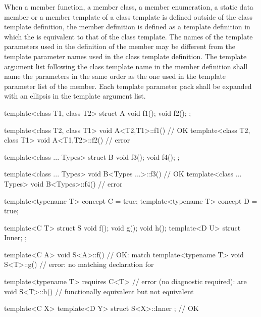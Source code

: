 \pnum
When a member function, a member class, a member enumeration, a static data member or
a member template of a class
template is defined outside of the class template definition,
the member definition is defined as a template definition in which the
 is equivalent to that
of the class template.
The names of the template parameters used in the definition of the member may
be different from the template parameter names used in the class
template definition.
The template argument list following the class template name in the member
definition shall name the parameters in the same order as the one used in
the template parameter list of the member. Each template
parameter pack shall be expanded with an ellipsis in the template
argument list.
\begin{example}
\begin{codeblock}
template<class T1, class T2> struct A {
  void f1();
  void f2();
};

template<class T2, class T1> void A<T2,T1>::f1() { }    // OK
template<class T2, class T1> void A<T1,T2>::f2() { }    // error
\end{codeblock}

\begin{codeblock}
template<class ... Types> struct B {
  void f3();
  void f4();
};

template<class ... Types> void B<Types ...>::f3() { }   // OK
template<class ... Types> void B<Types>::f4() { }       // error
\end{codeblock}

\begin{codeblock}
template<typename T> concept C = true;
template<typename T> concept D = true;

template<C T> struct S {
  void f();
  void g();
  void h();
  template<D U> struct Inner;
};

template<C A> void S<A>::f() { }        // OK:  match
template<typename T> void S<T>::g() { } // error: no matching declaration for 

template<typename T> requires C<T>      // error (no diagnostic required):  are
void S<T>::h() { }                      // functionally equivalent but not equivalent

template<C X> template<D Y>
struct S<X>::Inner { };                 // OK
\end{codeblock}
\end{example}

